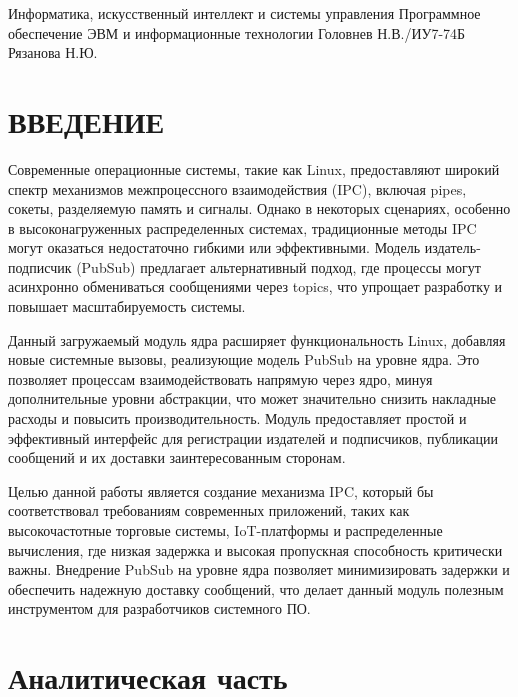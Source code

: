 \documentclass{bmstu}
\begin{document}
	\makecourseworktitle
	{Информатика, искусственный интеллект и системы управления} %
	{Программное обеспечение ЭВМ и информационные технологии} %
	{} %
	{Головнев Н.В./ИУ7-74Б} %
	{Рязанова Н.Ю.} %
	
\maketableofcontents
\chapter*{ВВЕДЕНИЕ}
Современные операционные системы, такие как Linux, предоставляют широкий спектр механизмов межпроцессного взаимодействия (IPC), включая pipes, сокеты, разделяемую память и сигналы. Однако в некоторых сценариях, особенно в высоконагруженных распределенных системах, традиционные методы IPC могут оказаться недостаточно гибкими или эффективными. Модель издатель-подписчик (PubSub) предлагает альтернативный подход, где процессы могут асинхронно обмениваться сообщениями через topics, что упрощает разработку и повышает масштабируемость системы.

Данный загружаемый модуль ядра расширяет функциональность Linux, добавляя новые системные вызовы, реализующие модель PubSub на уровне ядра. Это позволяет процессам взаимодействовать напрямую через ядро, минуя дополнительные уровни абстракции, что может значительно снизить накладные расходы и повысить производительность. Модуль предоставляет простой и эффективный интерфейс для регистрации издателей и подписчиков, публикации сообщений и их доставки заинтересованным сторонам.

Целью данной работы является создание механизма IPC, который бы соответствовал требованиям современных приложений, таких как высокочастотные торговые системы, IoT-платформы и распределенные вычисления, где низкая задержка и высокая пропускная способность критически важны. Внедрение PubSub на уровне ядра позволяет минимизировать задержки и обеспечить надежную доставку сообщений, что делает данный модуль полезным инструментом для разработчиков системного ПО.

\chapter{Аналитическая часть}
\end{document}
